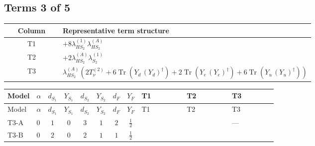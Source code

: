 \documentclass[8pt]{article}
\begin{document}
\begin{landscape}
\subsection*{Terms 3 of 5}
\begin{center}
\begin{tabular}{@{}c >{\raggedright\arraybackslash}p{0.82\linewidth}@{}}
\toprule
Column & Representative term structure \\
\midrule
T1 & \(\displaystyle +8 {\lambda_{HS_2}^{(1)}} {\lambda_{HS_2}^{(A)}}\) \\
\midrule
T2 & \(\displaystyle +2 {\lambda_{HS_2}^{(A)}} {\lambda_{S_2}^{(1)}}\) \\
\midrule
T3 & \(\displaystyle {\lambda_{HS_2}^{(A)}} (2 T_{\nu}^{(2)}+6 \operatorname{Tr}\!\left({Y_d}\,\left({Y_d}\right)^{\dagger}\right)+2 \operatorname{Tr}\!\left({Y_e}\,\left({Y_e}\right)^{\dagger}\right)+6 \operatorname{Tr}\!\left({Y_u}\,\left({Y_u}\right)^{\dagger}\right))\) \\
\midrule
\bottomrule
\end{tabular}
\end{center}
\smallskip
\tiny
\begin{longtable}{@{}llcccccc >{\raggedright\arraybackslash}p{0.21\linewidth} >{\raggedright\arraybackslash}p{0.21\linewidth} >{\raggedright\arraybackslash}p{0.21\linewidth}@{}}
\toprule
Model & $\alpha$ & $d_{S_1}$ & $Y_{S_1}$ & $d_{S_2}$ & $Y_{S_2}$ & $d_F$ & $Y_F$ & T1 & T2 & T3 \\
\midrule
\endfirsthead
\toprule
Model & $\alpha$ & $d_{S_1}$ & $Y_{S_1}$ & $d_{S_2}$ & $Y_{S_2}$ & $d_F$ & $Y_F$ & T1 & T2 & T3 \\
\midrule
\endhead
T3-A & $0$ & $1$ & $0$ & $3$ & $1$ & $2$ & $\frac{1}{2}$ & \scriptsize\adjustbox{max width=\linewidth}{$\begin{gathered} +8 {\lambda_{HS_2}^{(1)}} {\lambda_{HS_2}^{(A)}}\end{gathered}$} & \scriptsize\adjustbox{max width=\linewidth}{$\begin{gathered} +2 {\lambda_{HS_2}^{(A)}} {\lambda_{S_2}^{(1)}}\end{gathered}$} & --- \\
\midrule
T3-B & $0$ & $2$ & $0$ & $2$ & $1$ & $1$ & $\frac{1}{2}$ & \scriptsize\adjustbox{max width=\linewidth}{$\begin{gathered} +8 {\lambda_{HS_2}^{(1)}} {\lambda_{HS_2}^{(A)}}\end{gathered}$} & \scriptsize\adjustbox{max width=\linewidth}{$\begin{gathered} +2 {\lambda_{HS_2}^{(A)}} {\lambda_{S_2}^{(1)}}\end{gathered}$} & \scriptsize\adjustbox{max width=\linewidth}{$\begin{gathered} {\lambda_{HS_2}^{(A)}} (2 T_{\nu}^{(2)}+6 \operatorname{Tr}\!\left({Y_d}\,\left({Y_d}\right)^{\dagger}\right)+2 \operatorname{Tr}\!\left({Y_e}\,\left({Y_e}\right)^{\dagger}\right)+6 \operatorname{Tr}\!\left({Y_u}\,\left({Y_u}\right)^{\dagger}\right))\end{gathered}$} \\

\end{longtable}
\end{landscape}
\end{document}
